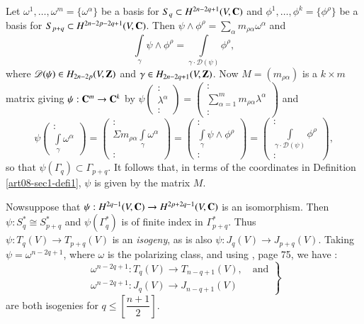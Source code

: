 Let $\omega^{1},\ldots,\omega^{m}=\{\omega^{\alpha}\}$ be a basis for $S_{q}\subset H^{2n-2q+1}(V,\mathbf{C})$ and $\phi^{1},\ldots,\phi^{k}=\{\phi^{\rho}\}$ be a basis for $S_{p+q}\subset H^{2n-2p-2q+1}(V,\mathbf{C})$. Then $\psi\wedge \phi^{\rho}=\sum\limits_{\alpha}m_{\rho\alpha}\omega^{\alpha}$ and 
\begin{equation}
\int\limits_{\gamma}\psi \wedge \phi^{\rho}=\int\limits_{\gamma\cdot \mathscr{D}(\psi)}\phi^{\rho},\label{art08-sec2-eq2.8}
\end{equation}
where $\mathscr{D}(\psi)\in H_{2n-2p}(V,\mathbf{Z})$ and $\gamma\in H_{2n-2q+1}(V,\mathbf{Z})$. Now $M=(m_{\rho\alpha})$ is a $k\times m$ matrix giving $\psi:\mathbf{C}^{m}\to \mathbf{C}^{k}$ by $\psi \left(\begin{smallmatrix} :\\ \lambda^{\alpha} \\ :\end{smallmatrix}\right)=\left(\begin{smallmatrix} :\\ \sum\limits^{m}_{\alpha=1} m_{\rho\alpha}\lambda^{\alpha}\\ :\end{smallmatrix}\right)$
 and
$$
\psi\left(\begin{matrix} 
:\\ \int\limits_{\gamma}\omega^{\alpha}
\end{matrix}\right)
=
\left(\begin{matrix}
:\\
\Sigma m_{\rho\alpha}\int\limits_{\gamma}\omega^{\alpha}\\
:
\end{matrix}\right)
=
\left(\begin{matrix}
:\\
\int\limits_{\gamma}\psi \wedge \phi^{\rho}\\
:
\end{matrix}\right)
=
\left(\begin{matrix}
:\\
\int\limits_{\gamma\cdot \mathscr{D}(\psi)} \phi^{\rho}\\
:
\end{matrix}\right),
$$
so that $\psi(\Gamma_{q})\subset \Gamma_{p+q}$. It follows that, in terms of the coordinates in Definition \ref{art08-sec1-defi1}, $\psi$ is given by the matrix $M$.

Now\pageoriginale suppose that $\psi:H^{2q-1}(V,\mathbf{C})\to H^{2p+2q-1}(V,\mathbf{C})$ is an isomorphism. Then $\psi:S^{*}_{q}\cong S^{*}_{p+q}$ and $\psi(\Gamma^{*}_{q})$ is of finite index in $\Gamma^{*}_{p+q}$. Thus $\psi:T_{q}(V)\to T_{p+q}(V)$ is an {\em isogeny}, as is also $\psi:J_{q}(V)\to J_{p+q}(V)$. Taking $\psi=\omega^{n-2q+1}$, where $\omega$ is the polarizing class, and using \cite{art08-key23}, page 75, we have :
\begin{equation}
\left.
\begin{array}{c}
\omega^{n-2q+1}:T_{q}(V)\to T_{n-q+1}(V),\text{~~ and}\\[3pt]
\omega^{n-2q+1} : J_{q}(V)\to J_{n-q+1}(V)
\end{array}\right\}\label{art08-sec2-eq2.9}
\end{equation}
are both isogenies for $q\leq \left[\dfrac{n+1}{2}\right]$.

